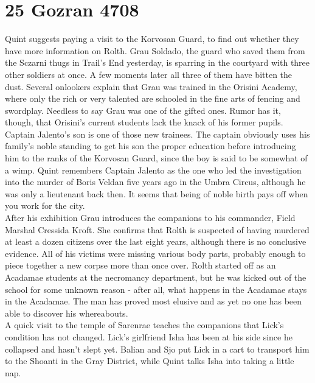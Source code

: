 \section{25 Gozran 4708}

Quint suggests paying a visit to the Korvosan Guard, to find out whether they have more information on Rolth. Grau Soldado, the guard who saved them from the Sczarni thugs in Trail's End yesterday, is sparring in the courtyard with three other soldiers at once. A few moments later all three of them have bitten the dust. Several onlookers explain that Grau was trained in the Orisini Academy, where only the rich or very talented are schooled in the fine arts of fencing and swordplay. Needless to say Grau was one of the gifted ones. Rumor has it, though, that Orisini's current students lack the knack of his former pupils. Captain Jalento's son is one of those new trainees. The captain obviously uses his family's noble standing to get his son the proper education before introducing him to the ranks of the Korvosan Guard, since the boy is said to be somewhat of a wimp. Quint remembers Captain Jalento as the one who led the investigation into the murder of Boris Veldan five years ago in the Umbra Circus, although he was only a lieutenant back then. It seems that being of noble birth pays off when you work for the city.\\

After his exhibition Grau introduces the companions to his commander, Field Marshal Cressida Kroft. She confirms that Rolth is suspected of having murdered at least a dozen citizens over the last eight years, although there is no conclusive evidence. All of his victims were missing various body parts, probably enough to piece together a new corpse more than once over. Rolth started off as an Acadamae students at the necromancy department, but he was kicked out of the school for some unknown reason - after all, what happens in the Acadamae stays in the Acadamae. The man has proved most elusive and as yet no one has been able to discover his whereabouts.\\

A quick visit to the temple of Sarenrae teaches the companions that Lick's condition has not changed. Lick's girlfriend Isha has been at his side since he collapsed and hasn't slept yet. Balian and Sjo put Lick in a cart to transport him to the Shoanti in the Gray District, while Quint talks Isha into taking a little nap.\\

